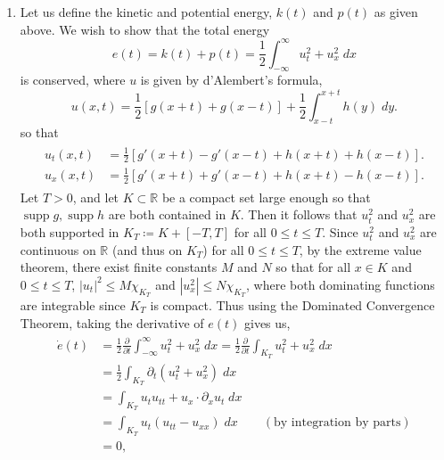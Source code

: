\documentclass{article}
\numberwithin{equation}{section}
\begin{document}
	\begin{enumerate}[itemsep =-2pt,label = (\roman{*})]
		\item Let us define the kinetic and potential energy, $k(t)$ and $p(t)$ as given above. We wish to show that the total energy 
		\begin{equation*}
			e(t) = k(t) + p(t) = \frac{1}{2}\int_{-\infty}^{\infty}u_t^2 + u_x^2\;dx
		\end{equation*}
		is conserved, where $u$ is given by d'Alembert's formula, 
		\begin{equation*}
			u(x, t) = \frac{1}{2}[g(x + t) + g(x - t)] + \frac{1}{2}\int_{x - t}^{x + t}h(y)\;dy. 
		\end{equation*}
		so that 
		\begin{align*}
			\begin{split}
				u_t(x,t) &= \frac{1}{2}[g'(x + t) - g'(x - t) + h(x + t) + h(x - t)]. \\
				u_x(x, t) &= \frac{1}{2}[g'(x + t) + g'(x - t) + h(x + t) - h(x - t)]. 
			\end{split}
		\end{align*}
		Let $T > 0$, and let $K \subset \mathbb{R}$ be a compact set large enough so that $\operatorname{supp}{g}, \operatorname{supp}{h}$ are both contained in $K$. Then it follows that $u_t^2$ and $u_x^2$ are both supported in $K_{T} \coloneqq K + [-T,T]$ for all $0 \leq t \leq T$. Since $u_t^2$ and $u_x^2$ are continuous on $\mathbb{R}$ (and thus on $K_T$) for all $0 \leq t \leq T$, by the extreme value theorem, there exist finite constants $M$ and $N$ so that for all $x \in K$ and $0 \leq t \leq T$, $|u_t|^2 \leq M\chi_{K_T}$ and $|u_x^2| \leq N\chi_{K_T}$, where both dominating functions are integrable since $K_{T}$ is compact. Thus using the Dominated Convergence Theorem, taking the derivative of $e(t)$ gives us, 
		\begin{align*}
			\begin{split}
				\dot{e}(t) &= \frac{1}{2}\frac{\partial}{\partial t}\int_{-\infty}^{\infty}u_t^2 + u_x^2\;dx = \frac{1}{2}\frac{\partial}{\partial t}\int_{K_T}u_t^2 + u_x^2\;dx \\
				&= \frac{1}{2}\int_{K_T}\partial_t(u_t^2 + u_x^2)\;dx \\
				&= \int_{K_T}u_tu_{tt} + u_x \cdot \partial_x u_t\;dx \\
				&= \int_{K_T}u_t(u_{tt} - u_{xx})\;dx \qquad (\text{by integration by parts}) \\
				&= 0, 
			\end{split}
		\end{align*}	

\end{enumerate}
\end{document}
